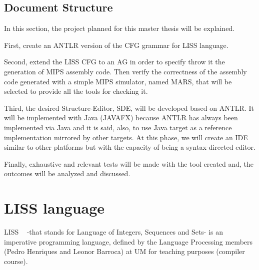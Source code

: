 \documentclass[
  oneside,
  11pt, a4paper,
  footinclude=true,
  headinclude=true,
  cleardoublepage=empty
]{scrbook}
\begin{document}
\section{Document Structure}	

In this section, the project planned for this master thesis will be explained.


First, create an ANTLR version of the CFG grammar for LISS language.


Second, extend the LISS CFG to an AG in order to specify throw it the generation of MIPS assembly code.
Then verify the correctness of the assembly code generated with a simple MIPS simulator, named MARS, that will be selected to provide all the tools for checking it.

Third, the desired Structure-Editor, SDE, will be developed based on ANTLR.
It will be implemented with Java (JAVAFX) because ANTLR has always been implemented via Java and it is said, also, to use Java target as a reference implementation mirrored by other targets.
At this phase, we will create an IDE similar to other platforms but with the capacity of being a syntax-directed editor.


Finally, exhaustive and relevant tests will be made with the tool created and, the outcomes will be analyzed and discussed.






\chapter{LISS language}

LISS ~\citep{CH07a} -that stands for Language of Integers, Sequences and Sets- is an imperative programming language, defined by the Language Processing members (Pedro Henriques and Leonor Barroca) at UM for teaching purposes (compiler course).
\end{document}
